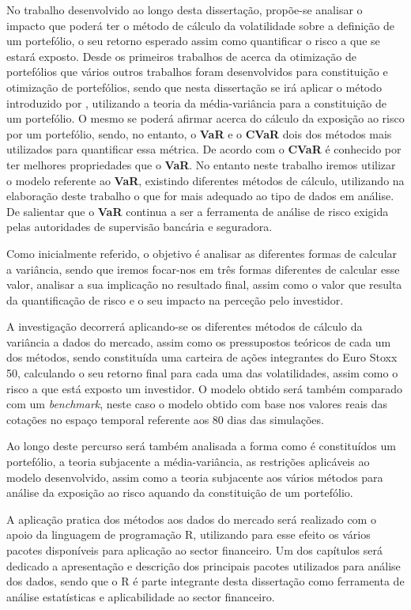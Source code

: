 \documentclass[
  12pt,
  a4paper,
  openany]{book}
\theoremstyle{definition}
\theoremstyle{definition}
\theoremstyle{definition}
\theoremstyle{remark}
\begin{document}
No trabalho desenvolvido ao longo desta dissertação, propõe-se analisar o impacto que poderá ter o método de cálculo da volatilidade sobre a definição de um portefólio, o seu retorno esperado assim como quantificar o risco a que se estará exposto. Desde os primeiros trabalhos de \citet{Markowitz1952} acerca da otimização de portefólios que vários outros trabalhos foram desenvolvidos para constituição e otimização de portefólios, sendo que nesta dissertação se irá aplicar o método introduzido por \citet{Markowitz1952}, utilizando a teoria da média-variância para a constituição de um portefólio. O mesmo se poderá afirmar acerca do cálculo da exposição ao risco por um portefólio, sendo, no entanto, o \textbf{VaR} e o \textbf{CVaR} dois dos métodos mais utilizados para quantificar essa métrica. De acordo com \citet{OptVaR2000} o \textbf{CVaR} é conhecido por ter melhores propriedades que o \textbf{VaR}. No entanto neste trabalho iremos utilizar o modelo referente ao \textbf{VaR}, existindo diferentes métodos de cálculo, utilizando na elaboração deste trabalho o que for mais adequado ao tipo de dados em análise. De salientar que o \textbf{VaR} continua a ser a ferramenta de análise de risco exigida pelas autoridades de supervisão bancária e seguradora.

Como inicialmente referido, o objetivo é analisar as diferentes formas de calcular a variância, sendo que iremos focar-nos em três formas diferentes de calcular esse valor, analisar a sua implicação no resultado final, assim como o valor que resulta da quantificação de risco e o seu impacto na perceção pelo investidor.

A investigação decorrerá aplicando-se os diferentes métodos de cálculo da variância a dados do mercado, assim como os pressupostos teóricos de cada um dos métodos, sendo constituída uma carteira de ações integrantes do Euro Stoxx 50, calculando o seu retorno final para cada uma das volatilidades, assim como o risco a que está exposto um investidor. O modelo obtido será também comparado com um \emph{benchmark}, neste caso o modelo obtido com base nos valores reais das cotações no espaço temporal referente aos 80 dias das simulações.

Ao longo deste percurso será também analisada a forma como é constituídos um portefólio, a teoria subjacente a média-variância, as restrições aplicáveis ao modelo desenvolvido, assim como a teoria subjacente aos vários métodos para análise da exposição ao risco aquando da constituição de um portefólio.

A aplicação pratica dos métodos aos dados do mercado será realizado com o apoio da linguagem de programação R, utilizando para esse efeito os vários pacotes disponíveis para aplicação ao sector financeiro. Um dos capítulos será dedicado a apresentação e descrição dos principais pacotes utilizados para análise dos dados, sendo que o R é parte integrante desta dissertação como ferramenta de análise estatísticas e aplicabilidade ao sector financeiro.
\end{document}
